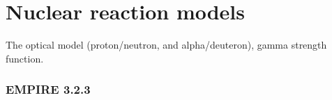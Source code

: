 \section{Nuclear reaction models}

The optical model (proton/neutron, and alpha/deuteron), gamma strength function. 

\subsubsection{EMPIRE 3.2.3}
